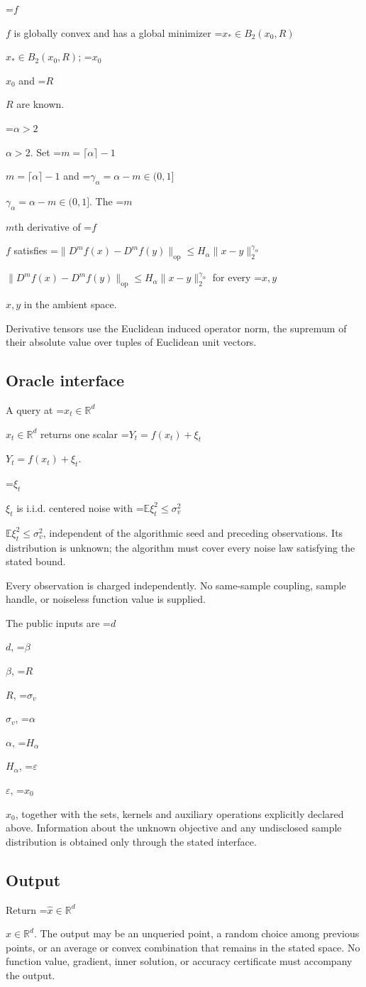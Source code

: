 \documentclass[10pt,a4paper]{article}
\newcommand{\AtlasMath}[1]{\par\begingroup\centering\setbox0=\hbox{$\displaystyle #1$}\ifdim\wd0>1.4\linewidth\typeout{ATLAS WIDE FORMULA: \the\wd0}\fi\ifdim\wd0>\linewidth\resizebox{\linewidth}{!}{\box0}\else\box0\fi\par\endgroup}
\newcommand{\AtlasInlineMath}[1]{\begingroup\setbox0=\hbox{$#1$}\ifdim\wd0>.4\linewidth\endgroup\AtlasMath{#1}\else\endgroup$#1$\fi}
\begin{document}
\AtlasInlineMath{f} is globally convex and has a global minimizer \AtlasInlineMath{x_*\in B_2(x_0,R)}; \AtlasInlineMath{x_0} and \AtlasInlineMath{R} are known.

\AtlasInlineMath{\alpha>2}. Set \AtlasInlineMath{m=\lceil\alpha\rceil-1} and \AtlasInlineMath{\gamma_\alpha=\alpha-m\in(0,1]}. The \AtlasInlineMath{m}th derivative of \AtlasInlineMath{f} satisfies \AtlasInlineMath{\|D^mf(x)-D^mf(y)\|_{\mathrm{op}}\le H_\alpha\|x-y\|_2^{\gamma_\alpha}} for every \AtlasInlineMath{x,y} in the ambient space.

Derivative tensors use the Euclidean induced operator norm, the supremum of their absolute value over tuples of Euclidean unit vectors.

\subsection{Oracle interface}
A query at \AtlasInlineMath{x_t\in \mathbb{R}^d} returns one scalar \AtlasInlineMath{Y_t=f(x_t)+\xi_t}.

\AtlasInlineMath{\xi_t} is i.i.d. centered noise with \AtlasInlineMath{\mathbb{E}\xi_t^2\le\sigma_v^2}, independent of the algorithmic seed and preceding observations. Its distribution is unknown; the algorithm must cover every noise law satisfying the stated bound.

Every observation is charged independently. No same-sample coupling, sample handle, or noiseless function value is supplied.

The public inputs are \AtlasInlineMath{d}, \AtlasInlineMath{\beta}, \AtlasInlineMath{R}, \AtlasInlineMath{\sigma_v}, \AtlasInlineMath{\alpha}, \AtlasInlineMath{H_\alpha}, \AtlasInlineMath{\varepsilon}, \AtlasInlineMath{x_0}, together with the sets, kernels and auxiliary operations explicitly declared above. Information about the unknown objective and any undisclosed sample distribution is obtained only through the stated interface.

\subsection{Output}
Return \AtlasInlineMath{\widehat{x}\in \mathbb{R}^d}. The output may be an unqueried point, a random choice among previous points, or an average or convex combination that remains in the stated space. No function value, gradient, inner solution, or accuracy certificate must accompany the output.
\end{document}
